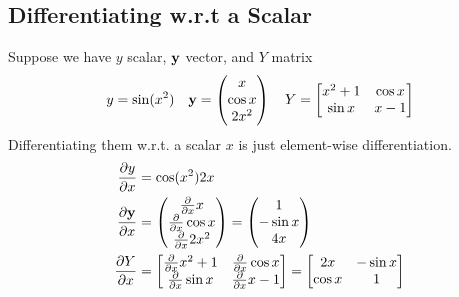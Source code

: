 \subsection{Differentiating w.r.t a Scalar}
Suppose we have $y$ scalar, $\textbf{y}$ vector, and $Y$ matrix
$$y = \sin(x^2) \quad \textbf{y} = \begin{pmatrix}
    x \\ \cos x \\ 2x^2
\end{pmatrix} \quad Y = \begin{bmatrix}
    x^2 + 1 & \cos x \\ \sin x & x - 1
\end{bmatrix}$$
Differentiating them w.r.t. a scalar $x$ is just element-wise differentiation.
\begin{align*}
    \frac{\partial y}{\partial x} &= \cos(x^2)2x \\
    \frac{\partial \textbf{y}}{\partial x} &= \begin{pmatrix}
        \frac{\partial}{\partial x} x \\ \frac{\partial}{\partial x} \cos x \\ \frac{\partial}{\partial x} 2x^2
    \end{pmatrix} = \begin{pmatrix}
        1 \\ -\sin x \\ 4x
    \end{pmatrix} \\
    \frac{\partial Y}{\partial x} &= \begin{bmatrix}
        \frac{\partial}{\partial x} x^2 + 1 & \frac{\partial}{\partial x} \cos x \\ \frac{\partial}{\partial x} \sin x & \frac{\partial}{\partial x} x - 1
    \end{bmatrix} = \begin{bmatrix}
        2x & -\sin x \\ \cos x & 1
    \end{bmatrix}
\end{align*}

